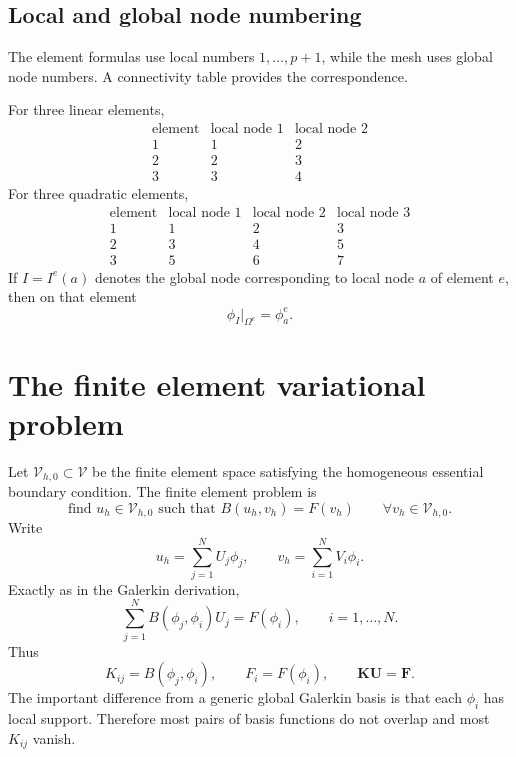 \documentclass[11pt]{article}
\newcommand{\Om}{\Omega}
\newcommand{\V}{\mathcal{V}}
\newcommand{\bU}{\mathbf{U}}
\newcommand{\bK}{\mathbf{K}}
\newcommand{\bF}{\mathbf{F}}
\begin{document}
\subsection{Local and global node numbering}

The element formulas use local numbers $1,\ldots,p+1$, while the mesh uses
global node numbers. A connectivity table provides the correspondence.

For three linear elements,
\[
\begin{array}{c|cc}
\text{element} & \text{local node 1} & \text{local node 2}\\\hline
1&1&2\\
2&2&3\\
3&3&4
\end{array}
\]
For three quadratic elements,
\[
\begin{array}{c|ccc}
\text{element} & \text{local node 1} & \text{local node 2} & \text{local node 3}\\\hline
1&1&2&3\\
2&3&4&5\\
3&5&6&7
\end{array}
\]
If $I=I^e(a)$ denotes the global node corresponding to local node $a$ of
element $e$, then on that element
\begin{equation}
\phi_I|_{\Om^e}=\phi_a^e.
\label{eq:local-global-restriction}
\end{equation}

\section{The finite element variational problem}

Let $\V_{h,0}\subset\V$ be the finite element space satisfying the homogeneous
essential boundary condition. The finite element problem is
\begin{equation}
\boxed{
\text{find }u_h\in\V_{h,0}\text{ such that }
B(u_h,v_h)=F(v_h)
\qquad\forall v_h\in\V_{h,0}.}
\label{eq:discrete}
\end{equation}
Write
\[
u_h=\sum_{j=1}^N U_j\phi_j,
\qquad
v_h=\sum_{i=1}^N V_i\phi_i.
\]
Exactly as in the Galerkin derivation,
\[
\sum_{j=1}^N B(\phi_j,\phi_i)U_j=F(\phi_i),
\qquad i=1,\ldots,N.
\]
Thus
\[
K_{ij}=B(\phi_j,\phi_i),
\qquad
F_i=F(\phi_i),
\qquad
\boxed{\bK\bU=\bF.}
\]
The important difference from a generic global Galerkin basis is that each
$\phi_i$ has local support. Therefore most pairs of basis functions do not
overlap and most $K_{ij}$ vanish.
\end{document}
